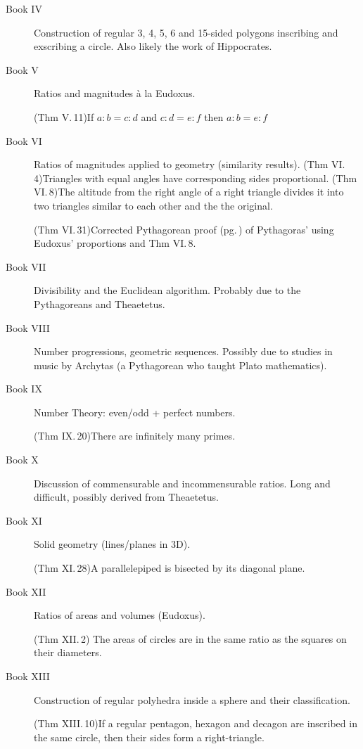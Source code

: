 \begin{description}
	\item[Book IV]\lstsp Construction of regular 3, 4, 5, 6 and 15-sided polygons inscribing and exscribing a circle. Also likely the work of Hippocrates.
	
	\item[Book V]\lstsp Ratios and magnitudes à la Eudoxus.\par
		(Thm V.\,11)\lstsp If $a:b=c:d$ and $c:d=e:f$ then $a:b=e:f$
	
	
	\item[Book VI]\lstsp Ratios of magnitudes applied to geometry (similarity results).\smallbreak
	  (Thm VI.\,4)\lstsp Triangles with equal angles have corresponding sides proportional.\smallbreak
	  (Thm VI.\,8)\lstsp The altitude from the right angle of a right triangle divides it into two triangles similar to each other and the the original.\par
	  (Thm VI.\,31)\lstsp Corrected Pythagorean proof (pg.\,\pageref{pthagorig}) of Pythagoras' using Eudoxus' proportions and Thm VI.\,8.
	  
	
	\item[Book VII]\lstsp Divisibility and the Euclidean algorithm. Probably due to the Pythagoreans and Theaetetus.
	
	
	\item[Book VIII]\lstsp Number progressions, geometric sequences. Possibly due to studies in music by Archytas (a Pythagorean who taught Plato mathematics).
	
	
	\item[Book IX]\lstsp Number Theory: even/odd + perfect numbers.\par
	(Thm IX.\,20)\lstsp There are infinitely many primes.
	
	
	\item[Book X]\lstsp Discussion of commensurable and incommensurable ratios. Long and difficult, possibly derived from Theaetetus.
	
	
	\item[Book XI]\lstsp Solid geometry (lines/planes in 3D).\par
		(Thm XI.\,28)\lstsp A parallelepiped is bisected by its diagonal plane.
		
		
	\item[Book XII]\lstsp Ratios of areas and volumes (Eudoxus).\par
		(Thm XII.\,2) The areas of circles are in the same ratio as the squares on their diameters.
	
	
	\item[Book XIII]\lstsp Construction of regular polyhedra inside a sphere and their classification.\par
		(Thm XIII.\,10)\lstsp If a regular pentagon, hexagon and decagon are inscribed in the same circle, then their sides form a right-triangle.
\end{description}

